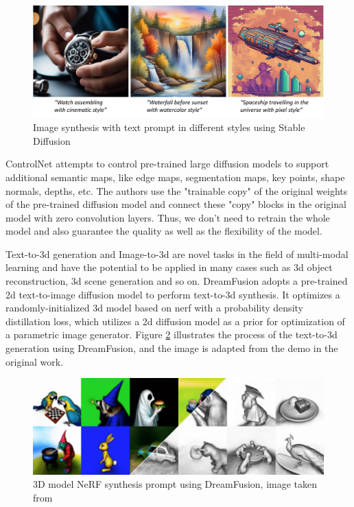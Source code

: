 \documentclass[12pt,DIV14,BCOR12mm,a4paper,footinclude=false,headinclude,parskip=half-,twoside,openright,cleardoublepage=empty,toc=index,bibliography=totoc,listof=totoc]{scrreprt}
\numberwithin{equation}{chapter}
\begin{document}
\begin{figure}[h]
	\centering
	\includegraphics[width=1.0\textwidth]{img/sd.pdf}
	\caption{Image synthesis with text prompt in different styles using Stable Diffusion \cite{rombach2022highresolution}}
	\label{img:sd}
\end{figure}

ControlNet \cite{zhang2023adding} attempts to control pre-trained large diffusion models to support additional semantic maps, like edge maps, segmentation maps, key points, shape normals, depths, etc. The authors use the "trainable copy" of the original weights of the pre-trained diffusion model and connect these "copy" blocks in the original model with zero convolution layers. Thus, we don't need to retrain the whole model and also guarantee the quality as well as the flexibility of the model.

Text-to-\gls{3d} generation and Image-to-\gls{3d} are novel tasks in the field of multi-modal learning and have the potential to be applied in many cases such as \gls{3d} object reconstruction, \gls{3d} scene generation and so on. DreamFusion \cite{poole2022dreamfusion} adopts a pre-trained \gls{2d} text-to-image diffusion model to perform text-to-\gls{3d} synthesis. It optimizes a randomly-initialized \gls{3d} model based on \gls{nerf} with a probability density distillation loss, which utilizes a \gls{2d} diffusion model as a prior for optimization of a parametric image generator. Figure \ref{img:df} illustrates the process of the text-to-\gls{3d} generation using DreamFusion, and the image is adapted from the demo in the original work.

\begin{figure}[h]
	\centering
	\includegraphics[width=1.0\textwidth]{img/df.png}
	\caption{3D model NeRF synthesis prompt using DreamFusion, image taken from \cite{poole2022dreamfusion}}
	\label{img:df}
\end{figure}
\end{document}
